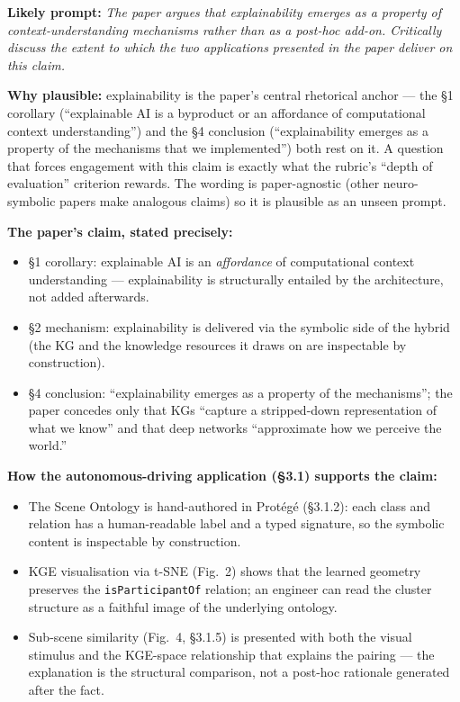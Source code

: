 \documentclass[11pt, a4paper]{article}
\begin{document}
\textbf{Likely prompt:} \emph{The paper argues that explainability emerges as a property of context-understanding mechanisms rather than as a post-hoc add-on. Critically discuss the extent to which the two applications presented in the paper deliver on this claim.}

\textbf{Why plausible:} explainability is the paper's central rhetorical anchor — the §1 corollary (``explainable AI is a byproduct or an affordance of computational context understanding'') and the §4 conclusion (``explainability emerges as a property of the mechanisms that we implemented'') both rest on it. A question that forces engagement with this claim is exactly what the rubric's ``depth of evaluation'' criterion rewards. The wording is paper-agnostic (other neuro-symbolic papers make analogous claims) so it is plausible as an unseen prompt.

\textbf{The paper's claim, stated precisely:}
\begin{itemize}
  \item §1 corollary: explainable AI is an \emph{affordance} of computational context understanding — explainability is structurally entailed by the architecture, not added afterwards.
  \item §2 mechanism: explainability is delivered via the symbolic side of the hybrid (the KG and the knowledge resources it draws on are inspectable by construction).
  \item §4 conclusion: ``explainability emerges as a property of the mechanisms''; the paper concedes only that KGs ``capture a stripped-down representation of what we know'' and that deep networks ``approximate how we perceive the world.''
\end{itemize}

\textbf{How the autonomous-driving application (§3.1) supports the claim:}
\begin{itemize}
  \item The Scene Ontology is hand-authored in Protégé (§3.1.2): each class and relation has a human-readable label and a typed signature, so the symbolic content is inspectable by construction.
  \item KGE visualisation via t-SNE (Fig.\ 2) shows that the learned geometry preserves the \texttt{isParticipantOf} relation; an engineer can read the cluster structure as a faithful image of the underlying ontology.
  \item Sub-scene similarity (Fig.\ 4, §3.1.5) is presented with both the visual stimulus and the KGE-space relationship that explains the pairing — the explanation is the structural comparison, not a post-hoc rationale generated after the fact.
\end{itemize}
\end{document}
